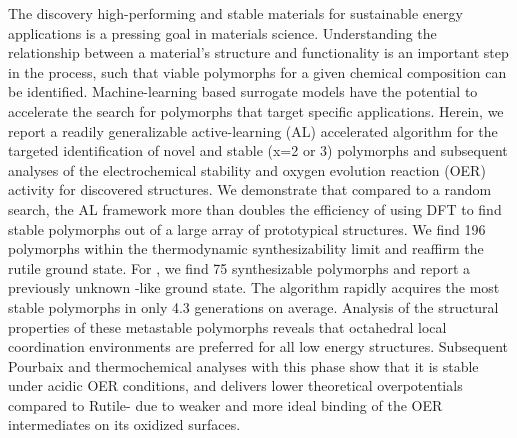 %


%
The discovery high-performing and stable materials for sustainable energy applications is a pressing goal in materials science. Understanding the relationship between a material's structure and functionality is an important step in the process, such that viable polymorphs for a given chemical composition can be identified.
%
Machine-learning based surrogate models have the potential to accelerate the search for polymorphs that target specific applications.
%
Herein, we report a readily generalizable active-learning (AL) accelerated algorithm for the targeted identification of novel and stable \IrOx (x=2 or 3) polymorphs and subsequent analyses of the electrochemical stability and oxygen evolution reaction (OER) activity for discovered structures.
%
We demonstrate that compared to a random search,
the AL framework more than doubles the efficiency of using DFT to find stable polymorphs out of a large array of prototypical structures.
%
We find \num{196} \IrOtwo polymorphs within the thermodynamic synthesizability limit and reaffirm the rutile ground state.
%
For \IrOthree, we find \num{75} synthesizable polymorphs and report a previously unknown -like ground state.
%
The algorithm rapidly acquires the most stable polymorphs in only \num{4.3} generations on average. %
%
Analysis of the structural properties of these metastable polymorphs reveals that octahedral local coordination environments are preferred for all low energy structures.
%
Subsequent Pourbaix and thermochemical analyses with this \aIrOthree phase show that it is stable under acidic OER conditions,
and delivers lower theoretical overpotentials compared to Rutile- due to weaker and more ideal binding of the OER intermediates on its oxidized surfaces.





